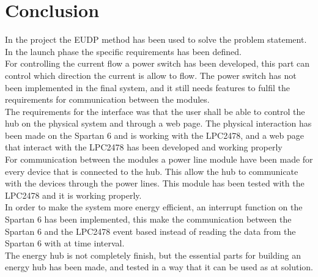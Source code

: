 \chapter{Conclusion}
%
In the project the EUDP method has been used to solve the problem statement. In the launch phase the specific requirements has been defined.\\
For controlling the current flow a power switch has been developed, this part can control which direction the current is allow to flow. The power switch has not been implemented in the final system, and it still needs features to fulfil the requirements for communication between the modules.\\
The requirements for the interface was that the user shall be able to control the hub on the physical system and through a web page. The physical interaction has been made on the Spartan 6 and is working with the LPC2478, and a web page that interact with the LPC2478 has been developed and working properly\\
For communication between the modules a power line module have been made for every device that is connected to the hub. This allow the hub to communicate with the devices through the power lines. This module has been tested with the LPC2478 and it is working properly.\\
In order to make the system more energy efficient, an interrupt function on the Spartan 6 has been implemented, this make the communication between the Spartan 6 and the LPC2478 event based instead of reading the data from the Spartan 6 with at time interval.\\
The energy hub is not completely finish, but the essential parts for building an energy hub has been made, and tested in a way that it can be used as at solution.